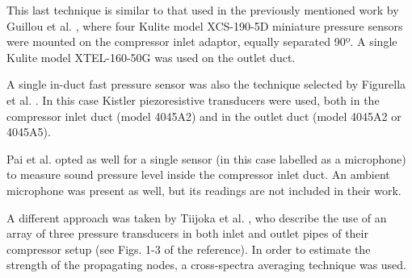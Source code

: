 This last technique is similar to that used in the previously mentioned work by Guillou et al. \cite{guillou2010characterization}, where four Kulite model XCS-190-5D miniature pressure sensors were mounted on the compressor inlet adaptor, equally separated 90º. A single Kulite model XTEL-160-50G was used on the outlet duct.

A single in-duct fast pressure sensor was also the technique selected by Figurella et al. \cite{figurella2012noise,figurella2014effect}. In this case Kistler piezoresistive transducers were used, both in the compressor inlet duct (model 4045A2) and in the outlet duct (model 4045A2 or 4045A5). 

Pai et al. \cite{pai2013air,pai2015turbocharger} opted as well for a single sensor (in this case labelled as a microphone) to measure sound pressure level inside the compressor inlet duct. An ambient microphone was present as well, but its readings are not included in their work.

A different approach was taken by Tiijoka et al. \cite{tiikoja2011inves}, who describe the use of an array of three pressure transducers in both inlet and outlet pipes of their compressor setup (see Figs. 1-3 of the reference). In order to estimate the strength of the propagating nodes, a cross-spectra averaging technique was used.


